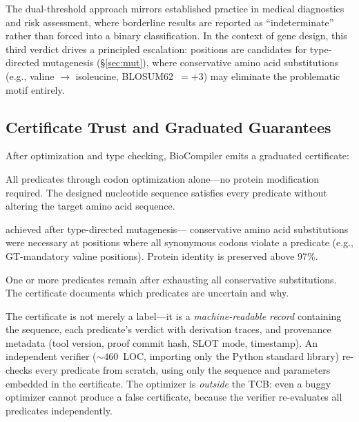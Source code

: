 The dual-threshold approach mirrors established practice in medical
diagnostics and risk assessment, where borderline results are reported
as ``indeterminate'' rather than forced into a binary classification.
In the context of gene design, this third verdict drives a principled
escalation: \UNCERTAIN{} positions are candidates for type-directed
mutagenesis (\S\ref{sec:mut}), where conservative amino acid
substitutions (e.g., valine $\to$ isoleucine, BLOSUM62~$= +3$) may
eliminate the problematic motif entirely.

\subsection{Certificate Trust and Graduated Guarantees}

After optimization and type checking, BioCompiler emits a graduated
certificate:
\begin{description}[leftmargin=!,labelwidth=1.4cm,itemsep=1pt,
                     topsep=1pt]
\item[\GOLD] All predicates \PASS{} through codon optimization
      alone---no protein modification required.
      The designed nucleotide sequence satisfies every predicate
      without altering the target amino acid sequence.
\item[\SILVER] \PASS{} achieved after type-directed mutagenesis---
      conservative amino acid substitutions were necessary at positions
      where all synonymous codons violate a predicate (e.g.,
      GT-mandatory valine positions).
      Protein identity is preserved above 97\%.
\item[\BRONZE] One or more predicates remain \UNCERTAIN{}
      after exhausting all conservative substitutions.
      The certificate documents which predicates are uncertain and why.
\end{description}

The certificate is not merely a label---it is a \emph{machine-readable
record} containing the sequence, each predicate's verdict with
derivation traces, and provenance metadata (tool version, proof commit
hash, SLOT mode, timestamp).
An independent verifier (${\sim}460$~LOC, importing only the Python
standard library) re-checks every predicate from scratch, using only
the sequence and parameters embedded in the certificate.
The optimizer is \emph{outside} the TCB: even a buggy optimizer
cannot produce a false \PASS{} certificate, because the verifier
re-evaluates all predicates independently.

